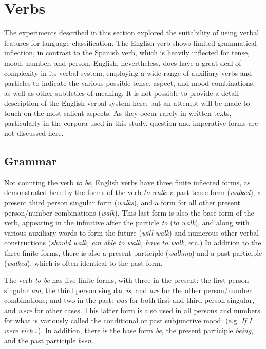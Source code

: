 \documentclass[main.tex]{subfiles}
\begin{document}
\section{Verbs}

The experiments described in this section explored the suitability of using verbal features for language classification. The English verb shows limited grammatical inflection, in contrast to the Spanish verb, which is heavily inflected for tense, mood, number, and person. English, nevertheless, does have a great deal of complexity in its verbal system, employing a wide range of auxiliary verbs and particles to indicate the various possible tense, aspect, and mood combinations, as well as other subtleties of meaning. It is not possible to provide a detail description of the English verbal system here, but an attempt will be made to touch on the most salient aspects. As they occur rarely in written texts, particularly in the corpora used in this study, question and imperative forms are not discussed here.

\subsection{Grammar}

Not counting the verb \textit{to be}, English verbs have three finite inflected forms, as demonstrated here by the forms of the verb \textit{to walk}: a past tense form (\textit{walked}), a present third person singular form (\textit{walks}), and a form for all other present person/number combinations (\textit{walk}). This last form is also the base form of the verb, appearing in the infinitive after the particle \textit{to} (\textit{to walk}), and along with various auxiliary words to form the future (\textit{will walk}) and numerous other verbal constructions (\textit{should walk, am able to walk, have to walk}, etc.) In addition to the three finite forms, there is also a present participle (\textit{walking}) and a past participle (\textit{walked}), which is often identical to the past form.

The verb \textit{to be} has five finite forms, with three in the present: the first person singular \textit{am}, the third person singular \textit{is}, and \textit{are} for the other person/number combinations; and two in the past: \textit{was} for both first and third person singular, and \textit{were} for other cases. This latter form is also used in all persons and numbers for what is variously called the conditional or past subjunctive mood: (e.g. \textit{If I were rich\ldots}). In addition, there is the base form \textit{be}, the present participle \textit{being}, and the past participle \textit{been}.
\end{document}
